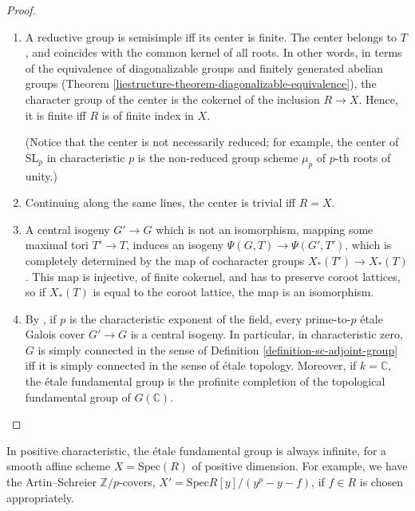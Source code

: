 \begin{proof}
\begin{enumerate}
 \item A reductive group is semisimple iff its center is finite. The center belongs to $T$, and coincides with the common kernel of all roots. In other words, in terms of the equivalence of diagonalizable groups and finitely generated abelian groups (Theorem \ref{liestructure-theorem-diagonalizable-equivalence}), the character group of the center is the cokernel of the inclusion $R\to X$. Hence, it is finite iff $R$ is of finite index in $X$.
 
 (Notice that the center is not necessarily reduced; for example, the center of $\text{SL}_p$ in characteristic $p$ is the non-reduced group scheme $\mu_p$ of $p$-th roots of unity.)
 
 \item Continuing along the same lines, the center is trivial iff $R=X$.
 
 \item A central isogeny $G'\to G$ which is not an isomorphism, mapping some maximal tori $T'\to T$,  induces an isogeny $\Psi(G,T)\to \Psi(G',T')$, which is completely determined by the map of cocharacter groups $X_*(T')\to X_*(T)$. This map is injective, of finite cokernel, and has to preserve coroot lattices, so if $X_*(T)$ is equal to the coroot lattice, the map is an isomorphism.
 
 \item By \cite[Theorem 1]{Brion-Szamuely}, if $p$ is the characteristic exponent of the field, every prime-to-$p$ \'etale Galois cover $G'\to G$ is a central isogeny. In particular, in characteristic zero, $G$ is simply connected in the sense of Definition \ref{definition-sc-adjoint-group} iff it is simply connected in the sense of \'etale topology. Moreover, if $k=\mathbb C$, the \'etale fundamental group is the profinite completion of the topological fundamental group of $G(\mathbb C)$. 
 
\end{enumerate}

\end{proof}


\begin{remark}
\label{remark-sc} 
In positive characteristic, the \'etale fundamental group is always infinite, for a smooth affine scheme $X= \text{Spec}(R)$ of positive dimension. For example, we have the Artin--Schreier $\mathbb Z/p$-covers, $X'=\text{Spec} R[y]/(y^p-y-f)$, if $f\in R$ is chosen appropriately.
\end{remark}





